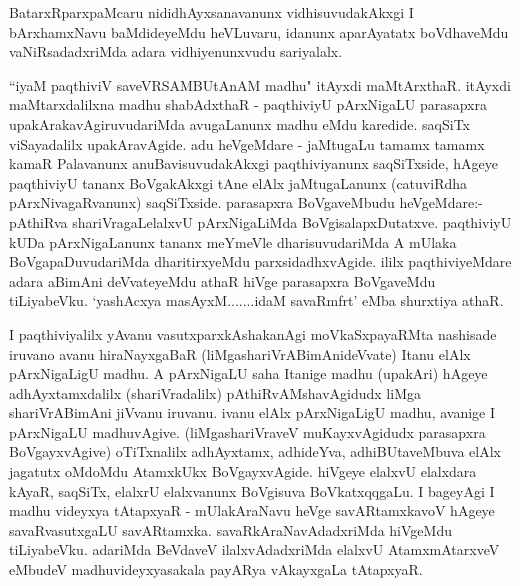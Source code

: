 \centerline{}

\begin{artha}
BatarxRparxpaMcaru nididhAyxsanavanunx vidhisuvudakAkxgi I bArxhamxNavu baMdideyeMdu 
heVLuvaru, idanunx aparAyatatx boVdhaveMdu vaNiRsadadxriMda adara vidhiyenunxvudu
sariyalalx.
\end{artha}

\begin{artha}
``iyaM paqthiviV saveVRSAMBUtAnAM madhu" itAyxdi maMtArxthaR. itAyxdi maMtarxdalilxna madhu shabAdxthaR - paqthiviyU 
pArxNigaLU parasapxra upakArakavAgiruvudariMda avugaLanunx madhu eMdu karedide. saqSiTx viSayadalilx upakAravAgide. adu heVgeMdare - jaMtugaLu tamamx tamamx kamaR Palavanunx 
anuBavisuvudakAkxgi paqthiviyanunx saqSiTxside, hAgeye paqthiviyU tananx BoVgakAkxgi tAne 
elAlx jaMtugaLanunx (catuviRdha pArxNivagaRvanunx) saqSiTxside. parasapxra BoVgaveMbudu 
heVgeMdare:- pAthiRva shariVragaLelalxvU pArxNigaLiMda BoVgisalapxDutatxve. paqthiviyU 
kUDa pArxNigaLanunx tananx meYmeVle dharisuvudariMda A mUlaka BoVgapaDuvudariMda 
dharitirxyeMdu parxsidadhxvAgide. ililx paqthiviyeMdare adara aBimAni deVvateyeMdu athaR hiVge parasapxra BoVgaveMdu tiLiyabeVku. `yashAcxya masAyxM.......idaM savaRmfrt' eMba shurxtiya athaR. 
\end{artha}

\centerline{}

\begin{artha}
I paqthiviyalilx yAvanu vasutxparxkAshakanAgi moVkaSxpayaRMta nashisade iruvano avanu hiraNayxgaBaR (liMgashariVrABimAnideVvate) Itanu elAlx pArxNigaLigU madhu. A pArxNigaLU saha Itanige madhu (upakAri) hAgeye adhAyxtamxdalilx (shariVradalilx) pAthiRvAMshavAgidudx liMga shariVrABimAni jiVvanu iruvanu. ivanu elAlx pArxNigaLigU madhu, avanige I pArxNigaLU madhuvAgive. (liMgashariVraveV muKayxvAgidudx parasapxra BoVgayxvAgive) oTiTxnalilx adhAyxtamx, adhideYva, adhiBUtaveMbuva elAlx jagatutx oMdoMdu AtamxkUkx BoVgayxvAgide. hiVgeye elalxvU elalxdara kAyaR, saqSiTx, elalxrU elalxvanunx BoVgisuva BoVkatxqqgaLu. I bageyAgi I madhu videyxya tAtapxyaR - mUlakAraNavu heVge savARtamxkavoV hAgeye savaRvasutxgaLU savARtamxka. savaRkAraNavAdadxriMda hiVgeMdu tiLiyabeVku. adariMda BeVdaveV ilalxvAdadxriMda elalxvU AtamxmAtarxveV eMbudeV madhuvideyxyasakala payARya vAkayxgaLa tAtapxyaR.
\end{artha}

